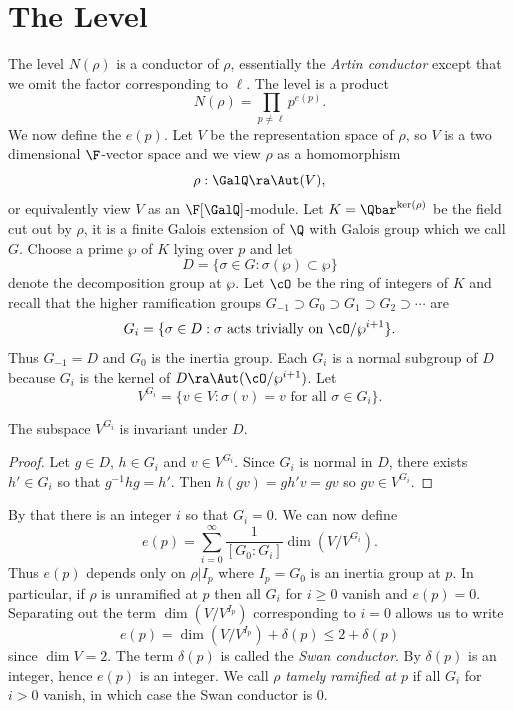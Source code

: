 \documentclass{report}
\begin{document}
\section{The Level}
The level $N(\rho)$ is a conductor of $\rho$,
essentially the {\em Artin conductor} except
that we omit the factor corresponding to $\ell$.
The level is a product
   $$N(\rho) = \prod_{p\neq\ell}p^{e(p)}.$$
We now define the $e(p)$.
Let $V$ be the representation space of $\rho$, so
$V$ is a two dimensional $\F$-vector space and we
view $\rho$ as a homomorphism
     $$\rho:\GalQ\ra\Aut(V),$$
or equivalently view $V$ as an $\F[\GalQ]$-module.
Let $K=\Qbar^{\ker(\rho)}$ be the field cut out
by $\rho$, it is a finite Galois extension of $\Q$
with Galois group which we call $G$.
Choose a prime $\wp$ of $K$ lying over $p$ and let
$$D = \{\sigma \in G : \sigma(\wp)\subset\wp\}$$
denote the decomposition group at $\wp$.
Let $\cO$ be the ring of integers of $K$ and
recall that the higher ramification groups
$G_{-1}\supset G_0\supset G_1\supset G_2\supset \cdots $ are
 $$G_i = \{ \sigma\in D :
     \sigma\text{ acts trivially on }\cO/\wp^{i+1}\}.$$
Thus $G_{-1}=D$ and $G_0$ is the inertia group.
Each $G_i$ is a normal subgroup of $D$ because $G_i$ is
the kernel of $D \ra \Aut(\cO/\wp^{i+1})$.
Let
$$V^{G_i} = \{v \in V : \sigma(v)=v\text{ for all }\sigma\in G_i\}.$$
\begin{lemma}
The subspace $V^{G_i}$ is invariant under $D$.
\end{lemma}
\begin{proof}
Let $g\in D$, $h\in G_i$ and $v\in V^{G_i}$.  Since $G_i$ is normal in $D$,
there exists $h'\in G_i$ so that $g^{-1}hg = h'$.  Then
$h(gv)=gh'v=gv$ so $gv\in V^{G_i}$.
\end{proof}
By \cite[\S9]{frohlich:local} that there is an integer $i$ so
that $G_i=0$.  We can now define
  $$e(p) = \sum_{i=0}^{\infty}
      \frac{1}{[G_0:G_i]} \dim(V/V^{G_i}).$$
Thus $e(p)$ depends only on $\rho|I_p$ where $I_p=G_0$
is an inertia group at $p$.  In particular, if $\rho$ is
unramified at $p$ then all $G_i$ for $i\geq 0$ vanish and
$e(p)=0$.
Separating out the term $\dim(V/V^{I_p})$ corresponding to $i=0$
allows us to write
      $$e(p)=\dim(V/V^{I_p})+\delta(p) \leq 2+\delta(p)$$
since $\dim V=2$.  The term $\delta(p)$ is called
the {\em Swan conductor}.   By \cite[19.3]{serre:linear} $\delta(p)$
is an integer, hence $e(p)$ is an integer.
We call $\rho$ {\em tamely ramified at $p$}
if all $G_i$ for $i>0$ vanish, in which case the Swan conductor
is $0$.
\end{document}
